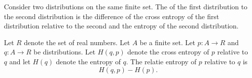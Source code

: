


Consider two distributions
on the same finite set.
The 
of the first distribution
 to the
second distribution
is the difference of
the cross entropy of the first
distribution relative to the second
and the entropy of the second distribution.


Let $R$ denote the set of
real numbers. Let
$A$ be a finite set.
Let $p: A \to R$ and
$q: A \to R$ be distributions.
Let $H(q, p)$ denote the
cross entropy of $p$ relative
to $q$ and let $H(q)$ denote
the entropy of $q$.
The relatie entropy of $p$ relative to $q$
is
\[
  H(q, p) - H(p).
\]
